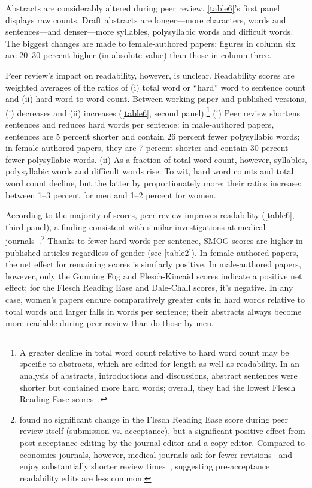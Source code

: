 

Abstracts are considerably altered during peer review. \autoref{table6}'s first panel displays raw counts. Draft abstracts are longer---more characters, words and sentences---and denser---more syllables, polysyllabic words and difficult words. The biggest changes are made to female-authored papers: figures in column six are 20--30 percent higher (in absolute value) than those in column three.

Peer review's impact on readability, however, is unclear. Readability scores are weighted averages of the ratios of (i) total word or ``hard'' word to sentence count and (ii) hard word to word count. Between working paper and published versions, (i) decreases and (ii) increases (\autoref{table6}, second panel).\footnote{A greater decline in total word count relative to hard word count may be specific to abstracts, which are edited for length as well as readability. In an analysis of abstracts, introductions and discussions, abstract sentences were shorter but contained more hard words; overall, they had the lowest Flesch Reading Ease scores~\citep{Hartley2003a}.} (i) Peer review shortens sentences and reduces hard words per sentence: in male-authored papers, sentences are 5 percent shorter and contain 26 percent fewer polysyllabic words; in female-authored papers, they are 7 percent shorter and contain 30 percent fewer polysyllabic words. (ii) As a fraction of total word count, however, syllables, polysyllabic words and difficult words rise. To wit, hard word counts and total word count decline, but the latter by proportionately more; their ratios increase: between 1--3 percent for men and 1--2 percent for women.

According to the majority of scores, peer review improves readability (\autoref{table6}, third panel), a finding consistent with similar investigations at medical journals~\citep{Biddle1996,Hayden2008,Roberts1994}.\footnote{\citet{Hayden2008} found no significant change in the Flesch Reading Ease score during peer review itself (submission vs. acceptance), but a significant positive effect from post-acceptance editing by the journal editor and a copy-editor. Compared to economics journals, however, medical journals ask for fewer revisions~\citep{Ellison2002a,Hayden2008} and enjoy substantially shorter review times~\citep[see, \emph{e.g.},][]{Trauma2015}, suggesting pre-acceptance readability edits are less common.} Thanks to fewer hard words per sentence, SMOG scores are higher in published articles regardless of gender (see \autoref{table2}). In female-authored papers, the net effect for remaining scores is similarly positive. In male-authored papers, however, only the Gunning Fog and Flesch-Kincaid scores indicate a positive net effect; for the Flesch Reading Ease and Dale-Chall scores, it's negative. In any case, women's papers endure comparatively greater cuts in hard words relative to total words and larger falls in words per sentence; their abstracts always become more readable during peer review than do those by men.

